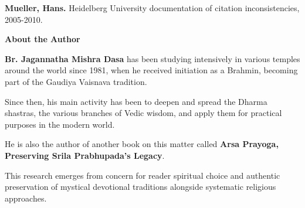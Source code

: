 \documentclass[11pt,twoside]{book}
\begin{document}
\textbf{\textbf{Mueller, Hans.}} Heidelberg University documentation of citation inconsistencies, 2005-2010.



\clearpage
\pagestyle{sectionopening}
\thispagestyle{sectionopening}
\markboth{}{}
\markright{}
\vspace*{0.25\textheight}
\begin{center}
{\Huge\bfseries About the Author}
\end{center}
\newpage

\textbf{\textbf{Br. Jagannatha Mishra Dasa}} has been studying intensively in various temples around the world since 1981, when he received initiation as a Brahmin, becoming part of the Gaudiya Vaisnava tradition.

Since then, his main activity has been to deepen and spread the Dharma shastras, the various branches of Vedic wisdom, and apply them for practical purposes in the modern world. 

He is also the author of another book on this matter called \textbf{Arsa Prayoga, Preserving Srila Prabhupada's Legacy}.

This research emerges from concern for reader spiritual choice and authentic preservation of mystical devotional traditions alongside systematic religious approaches.
\end{document}
